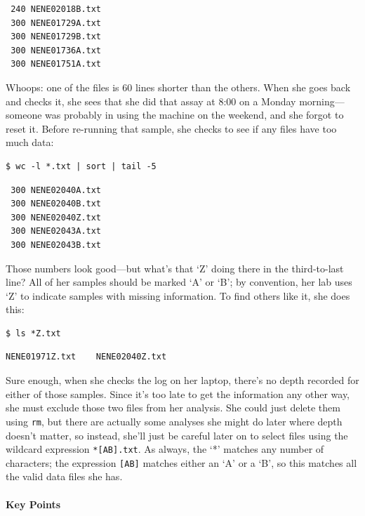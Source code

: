 \documentclass{book}
\begin{document}
\begin{verbatim}
 240 NENE02018B.txt
 300 NENE01729A.txt
 300 NENE01729B.txt
 300 NENE01736A.txt
 300 NENE01751A.txt
\end{verbatim}

Whoops: one of the files is 60 lines shorter than the others. When she
goes back and checks it, she sees that she did that assay at 8:00 on a
Monday morning---someone was probably in using the machine on the
weekend, and she forgot to reset it. Before re-running that sample, she
checks to see if any files have too much data:

\begin{verbatim}
$ wc -l *.txt | sort | tail -5
\end{verbatim}

\begin{verbatim}
 300 NENE02040A.txt
 300 NENE02040B.txt
 300 NENE02040Z.txt
 300 NENE02043A.txt
 300 NENE02043B.txt
\end{verbatim}

Those numbers look good---but what's that `Z' doing there in the
third-to-last line? All of her samples should be marked `A' or `B'; by
convention, her lab uses `Z' to indicate samples with missing
information. To find others like it, she does this:

\begin{verbatim}
$ ls *Z.txt
\end{verbatim}

\begin{verbatim}
NENE01971Z.txt    NENE02040Z.txt
\end{verbatim}

Sure enough, when she checks the log on her laptop, there's no depth
recorded for either of those samples. Since it's too late to get the
information any other way, she must exclude those two files from her
analysis. She could just delete them using \texttt{rm}, but there are
actually some analyses she might do later where depth doesn't matter, so
instead, she'll just be careful later on to select files using the
wildcard expression \texttt{*{[}AB{]}.txt}. As always, the `*' matches
any number of characters; the expression \texttt{{[}AB{]}} matches
either an `A' or a `B', so this matches all the valid data files she
has.

\mbox{}\paragraph{Key Points}
\end{document}
